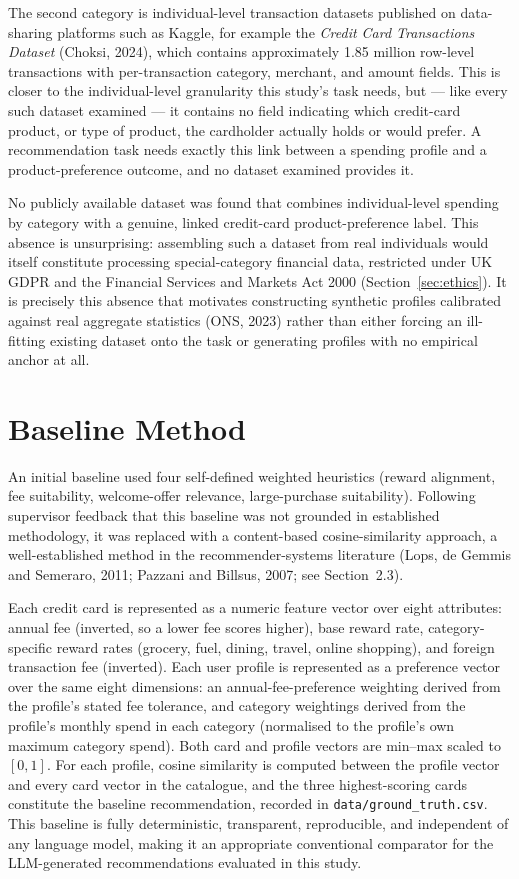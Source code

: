 The second category is individual-level transaction datasets published on data-sharing platforms such as Kaggle, for example the \textit{Credit Card Transactions Dataset} (Choksi, 2024), which contains approximately 1.85 million row-level transactions with per-transaction category, merchant, and amount fields. This is closer to the individual-level granularity this study's task needs, but --- like every such dataset examined --- it contains no field indicating which credit-card product, or type of product, the cardholder actually holds or would prefer. A recommendation task needs exactly this link between a spending profile and a product-preference outcome, and no dataset examined provides it.

No publicly available dataset was found that combines individual-level spending by category with a genuine, linked credit-card product-preference label. This absence is unsurprising: assembling such a dataset from real individuals would itself constitute processing special-category financial data, restricted under UK GDPR and the Financial Services and Markets Act 2000 (Section~\ref{sec:ethics}). It is precisely this absence that motivates constructing synthetic profiles calibrated against real aggregate statistics (ONS, 2023) rather than either forcing an ill-fitting existing dataset onto the task or generating profiles with no empirical anchor at all.

\section{Baseline Method}
\label{sec:baseline}

An initial baseline used four self-defined weighted heuristics (reward alignment, fee suitability, welcome-offer relevance, large-purchase suitability). Following supervisor feedback that this baseline was not grounded in established methodology, it was replaced with a content-based cosine-similarity approach, a well-established method in the recommender-systems literature (Lops, de Gemmis and Semeraro, 2011; Pazzani and Billsus, 2007; see Section~2.3).

Each credit card is represented as a numeric feature vector over eight attributes: annual fee (inverted, so a lower fee scores higher), base reward rate, category-specific reward rates (grocery, fuel, dining, travel, online shopping), and foreign transaction fee (inverted). Each user profile is represented as a preference vector over the same eight dimensions: an annual-fee-preference weighting derived from the profile's stated fee tolerance, and category weightings derived from the profile's monthly spend in each category (normalised to the profile's own maximum category spend). Both card and profile vectors are min--max scaled to $[0, 1]$. For each profile, cosine similarity is computed between the profile vector and every card vector in the catalogue, and the three highest-scoring cards constitute the baseline recommendation, recorded in \texttt{data/ground\_truth.csv}. This baseline is fully deterministic, transparent, reproducible, and independent of any language model, making it an appropriate conventional comparator for the LLM-generated recommendations evaluated in this study.

